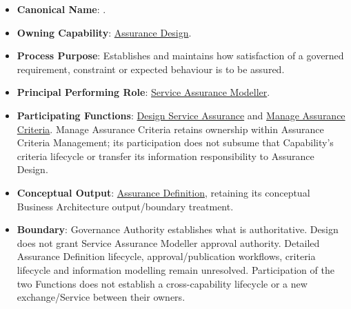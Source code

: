 \begin{itemize}

\item
\textbf{Canonical Name}: \texttt{}.



\item
\textbf{Owning Capability}: \hyperref[rad:enabling:680]{Assurance Design}.



\item
\textbf{Process Purpose}: Establishes and maintains how satisfaction of a governed requirement, constraint or expected behaviour is to be assured.



\item
\textbf{Principal Performing Role}: \href{https://github.com/fhirfactory/harmonia/blob/98410db60155198a75f74c79d98060070209faa1/docs/markdown/03-business-architecture/actors-roles/roles.md\#service-assurance-modeller}{Service Assurance Modeller}.



\item
\textbf{Participating Functions}: \hyperref[rad:assurance:71]{Design Service Assurance} and \hyperref[rad:assurance:84]{Manage Assurance Criteria}. Manage Assurance Criteria retains ownership within Assurance Criteria Management; its participation does not subsume that Capability's criteria lifecycle or transfer its information responsibility to Assurance Design.



\item
\textbf{Conceptual Output}: \hyperref[rad:assurance:150]{Assurance Definition}, retaining its conceptual Business Architecture output/\allowbreak{}boundary treatment.



\item
\textbf{Boundary}: Governance Authority establishes what is authoritative. Design does not grant Service Assurance Modeller approval authority. Detailed Assurance Definition lifecycle, approval/\allowbreak{}publication workflows, criteria lifecycle and information modelling remain unresolved. Participation of the two Functions does not establish a cross-capability lifecycle or a new exchange/\allowbreak{}Service between their owners.



\end{itemize}
\label{rad:processes:365}



